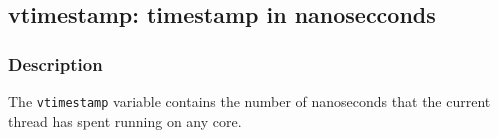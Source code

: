 \clearpage
{}
{}
\label{vars:vtimestamp}
\subsection*{vtimestamp: timestamp in nanosecconds}

\subsubsection*{Description}

The \verb|vtimestamp| variable contains the number of nanoseconds
that the current thread has spent running on any core.

